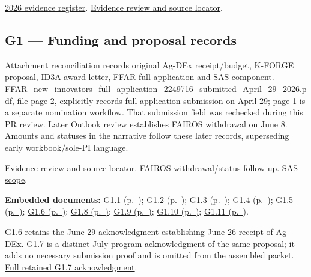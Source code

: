 \href{https://github.com/molikd/Molik-Tenure-Document/blob/codex/2026-portfolio/planning/2026-evidence-register.md}{2026 evidence register}.
\href{https://github.com/molikd/Molik-Tenure-Document/issues/4}{Evidence review and source locator}.

\hypertarget{evidence-G1}{}
\subsection{G1 --- Funding and proposal records}
Attachment reconciliation records original Ag-DEx receipt/budget, K-FORGE proposal, ID3A award letter, FFAR full application and SAS component. FFAR\_new\_innovators\_full\_application\_2249716\_submitted\_April\_29\_2026.pdf, file page 2, explicitly records full-application submission on April 29; page 1 is a separate nomination workflow. That submission field was rechecked during this PR review. Later Outlook review establishes FAIROS withdrawal on June 8. Amounts and statuses in the narrative follow these later records, superseding early workbook/sole-PI language.

\href{https://github.com/molikd/Molik-Tenure-Document/issues/4#issuecomment-5682646028}{Evidence review and source locator}.
\href{https://github.com/molikd/Molik-Tenure-Document/issues/4#issuecomment-5683209268}{FAIROS withdrawal/status follow-up}.
\href{https://github.com/user-attachments/files/32247300/OPE_SOW_Data_Infrastructure_Component_v3.docx}{SAS scope}.

\par\medskip\noindent\textbf{Embedded documents:} \hyperref[supplement-G1.1]{G1.1 (p.~\pageref{supplement-G1.1})}; \hyperref[supplement-G1.2]{G1.2 (p.~\pageref{supplement-G1.2})}; \hyperref[supplement-G1.3]{G1.3 (p.~\pageref{supplement-G1.3})}; \hyperref[supplement-G1.4]{G1.4 (p.~\pageref{supplement-G1.4})}; \hyperref[supplement-G1.5]{G1.5 (p.~\pageref{supplement-G1.5})}; \hyperref[supplement-G1.6]{G1.6 (p.~\pageref{supplement-G1.6})}; \hyperref[supplement-G1.8]{G1.8 (p.~\pageref{supplement-G1.8})}; \hyperref[supplement-G1.9]{G1.9 (p.~\pageref{supplement-G1.9})}; \hyperref[supplement-G1.10]{G1.10 (p.~\pageref{supplement-G1.10})}; \hyperref[supplement-G1.11]{G1.11 (p.~\pageref{supplement-G1.11})}.

G1.6 retains the June 29 acknowledgment establishing June 26 receipt of Ag-DEx.
G1.7 is a distinct July program acknowledgment of the same proposal; it adds no
necessary submission proof and is omitted from the assembled packet.
\href{https://github.com/molikd/Molik-Tenure-Document/blob/main/evidence/2026/AgDEx_OSP_26_2133_program_acknowledgment_June_2026.pdf}{Full retained G1.7 acknowledgment}.

